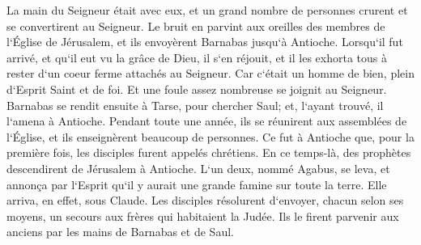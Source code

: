 \verse La main du Seigneur était avec eux, et un grand nombre de personnes crurent et se convertirent au Seigneur. 
\verse Le bruit en parvint aux oreilles des membres de l`Église de Jérusalem, et ils envoyèrent Barnabas jusqu`à Antioche. 
\verse Lorsqu`il fut arrivé, et qu`il eut vu la grâce de Dieu, il s`en réjouit, et il les exhorta tous à rester d`un coeur ferme attachés au Seigneur. 
\verse Car c`était un homme de bien, plein d`Esprit Saint et de foi. Et une foule assez nombreuse se joignit au Seigneur. 
\verse Barnabas se rendit ensuite à Tarse, pour chercher Saul; 
\verse et, l`ayant trouvé, il l`amena à Antioche. Pendant toute une année, ils se réunirent aux assemblées de l`Église, et ils enseignèrent beaucoup de personnes. Ce fut à Antioche que, pour la première fois, les disciples furent appelés chrétiens. 
\verse En ce temps-là, des prophètes descendirent de Jérusalem à Antioche. 
\verse L`un deux, nommé Agabus, se leva, et annonça par l`Esprit qu`il y aurait une grande famine sur toute la terre. Elle arriva, en effet, sous Claude. 
\verse Les disciples résolurent d`envoyer, chacun selon ses moyens, un secours aux frères qui habitaient la Judée. 
\verse Ils le firent parvenir aux anciens par les mains de Barnabas et de Saul. 

